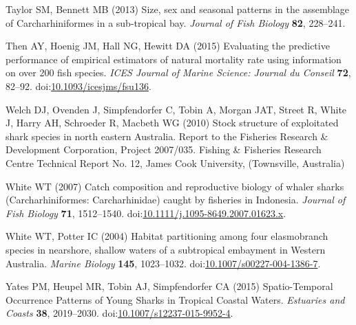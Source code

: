 \documentclass[]{article}
\begin{document}
\hypertarget{ref-taylor_size_2013}{}
Taylor SM, Bennett MB (2013) Size, sex and seasonal patterns in the
assemblage of Carcharhiniformes in a sub-tropical bay. \emph{Journal of
Fish Biology} \textbf{82}, 228--241.

\hypertarget{ref-then_evaluating_2015}{}
Then AY, Hoenig JM, Hall NG, Hewitt DA (2015) Evaluating the predictive
performance of empirical estimators of natural mortality rate using
information on over 200 fish species. \emph{ICES Journal of Marine
Science: Journal du Conseil} \textbf{72}, 82--92.
doi:\href{https://doi.org/10.1093/icesjms/fsu136}{10.1093/icesjms/fsu136}.

\hypertarget{ref-welch_stock_2010}{}
Welch DJ, Ovenden J, Simpfendorfer C, Tobin A, Morgan JAT, Street R,
White J, Harry AH, Schroeder R, Macbeth WG (2010) Stock structure of
exploitated shark species in north eastern Australia. Report to the
Fisheries Research \& Development Corporation, Project 2007/035. Fishing
\& Fisheries Research Centre Technical Report No. 12, James Cook
University, (Townsville, Australia)

\hypertarget{ref-white_catch_2007}{}
White WT (2007) Catch composition and reproductive biology of whaler
sharks (Carcharhiniformes: Carcharhinidae) caught by fisheries in
Indonesia. \emph{Journal of Fish Biology} \textbf{71}, 1512--1540.
doi:\href{https://doi.org/10.1111/j.1095-8649.2007.01623.x}{10.1111/j.1095-8649.2007.01623.x}.

\hypertarget{ref-white_habitat_2004}{}
White WT, Potter IC (2004) Habitat partitioning among four elasmobranch
species in nearshore, shallow waters of a subtropical embayment in
Western Australia. \emph{Marine Biology} \textbf{145}, 1023--1032.
doi:\href{https://doi.org/10.1007/s00227-004-1386-7}{10.1007/s00227-004-1386-7}.

\hypertarget{ref-yates_spatio-temporal_2015}{}
Yates PM, Heupel MR, Tobin AJ, Simpfendorfer CA (2015) Spatio-Temporal
Occurrence Patterns of Young Sharks in Tropical Coastal Waters.
\emph{Estuaries and Coasts} \textbf{38}, 2019--2030.
doi:\href{https://doi.org/10.1007/s12237-015-9952-4}{10.1007/s12237-015-9952-4}.
\end{document}
